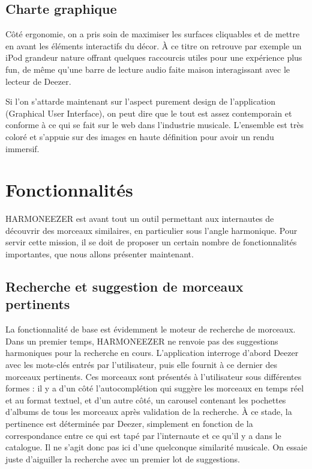 \documentclass[a4paper,12pt]{article}
\begin{document}
\subsection{Charte graphique}

Côté ergonomie, on a pris soin de maximiser les surfaces cliquables et de mettre en avant les éléments interactifs du décor. À ce titre on retrouve par exemple un iPod grandeur nature offrant quelques raccourcis utiles pour une expérience plus fun, de même qu'une barre de lecture audio faite maison interagissant avec le lecteur de Deezer.

Si l'on s'attarde maintenant sur l'aspect purement design de l'application (Graphical User Interface), on peut dire que le tout est assez contemporain et conforme à ce qui se fait sur le web dans l'industrie musicale. L'ensemble est très coloré et s'appuie sur des images en haute définition pour avoir un rendu immersif.

\section{Fonctionnalités}

HARMONEEZER est avant tout un outil permettant aux internautes de découvrir des morceaux similaires, en particulier sous l'angle harmonique. Pour servir cette mission, il se doit de proposer un certain nombre de fonctionnalités importantes, que nous allons présenter maintenant.

\subsection{Recherche et suggestion de morceaux pertinents}

La fonctionnalité de base est évidemment le moteur de recherche de morceaux. Dans un premier temps, HARMONEEZER ne renvoie pas des suggestions harmoniques pour la recherche en cours. L'application interroge d'abord Deezer avec les mots-clés entrés par l'utilisateur, puis elle fournit à ce dernier des morceaux pertinents. Ces morceaux sont présentés à l'utilisateur sous différentes formes : il y a d'un côté l'autocomplétion qui suggère les morceaux en temps réel et au format textuel, et d'un autre côté, un carousel contenant les pochettes d'albums de tous les morceaux après validation de la recherche. À ce stade, la pertinence est déterminée par Deezer, simplement en fonction de la correspondance entre ce qui est tapé par l'internaute et ce qu'il y a dans le catalogue. Il ne s'agit donc pas ici d'une quelconque similarité musicale. On essaie juste d'aiguiller la recherche avec un premier lot de suggestions.
\end{document}

